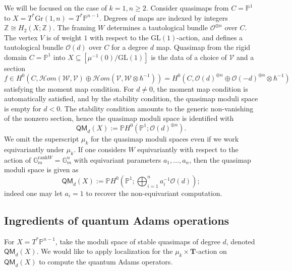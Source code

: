 \documentclass[reqno]{amsart}
\numberwithin{equation}{section}
\numberwithin{equation}{section}
\numberwithin{equation}{section}
\theoremstyle{definition}
\theoremstyle{remark}
\theoremstyle{remark}
\begin{document}
We will be focused on the case of $k=1, n \ge2$. Consider quasimaps from $C = \mathbb{P}^1$ to $X = T^*\mathrm{Gr}(1,n) = T^*\mathbb{P}^{n-1}$. Degrees of maps are indexed by integers $\mathbb{Z} \cong H_2(X;\mathbb{Z})$. The framing $W$ determines a tautological bundle $\mathcal{O}^{\oplus n}$ over $C$. The vertex $V$ is of weight $1$ with respect to the $\mathrm{GL}(1)$-action, and defines a tautological bundle $\mathcal{O}(d)$ over $C$ for a degree $d$ map. Quasimap from the rigid domain $C = \mathbb{P}^1$ into $ X \subseteq [ \mu^{-1}(0) / \mathrm{GL}(1) ]$ is the data of a choice of $\mathcal{V}$ and a section
\begin{equation}
    f \in H^0 \left( C, \mathcal{H}om(\mathcal{W}, \mathcal{V}) \oplus \mathcal{H}om(\mathcal{V}, \mathcal{W} \otimes \hbar^{-1})  \right) = H^0\left(C, \mathcal{O}(d)^{\oplus n} \oplus \mathcal{O}(-d)^{\oplus n} \otimes \hbar^{-1} \right)
\end{equation}
satisfying the moment map condition. For $d \neq 0$, the moment map condition is automatically satisfied, and by the stability condition, the quasimap moduli space is empty for $d < 0$. The stability condition amounts to the generic non-vanishing of the nonzero section, hence the quasimap moduli space is identified with
\begin{equation}
    \mathsf{QM}_d(X) := \mathbb{P} H^0 \left( \mathbb{P}^1; \mathcal{O}(d)^{\oplus n} \right).
\end{equation}
We omit the superscript $\mu_k$ for the quasimap moduli spaces even if we work equivariantly under $\mu_k$. If one considers $W$ equivariantly with respect to the action of $\mathbb{G}_m^{\mathrm{rank} W} = \mathbb{G}_m^n$ with equivariant parameters $a_1, \dots, a_n$, then the quasimap moduli space is given as
\begin{equation}
    \mathsf{QM}_d(X) := \mathbb{P} H^0 \left( \mathbb{P}^1; \bigoplus_{i=1}^n a_i^{-1} \mathcal{O}(d) \right);
\end{equation}
indeed one may let $a_i =1$ to recover the non-equivariant computation.

\subsection{Ingredients of quantum Adams operations}
For $X = T^*{\mathbb{P}^{n-1}}$, take the moduli space of stable quasimaps of degree $d$, denoted $\mathsf{QM}_d(X)$. We would like to apply localization for the $\mu_k \times \mathbf{T}$-action on $\mathsf{QM}_d(X)$ to compute the quantum Adams operators. 
\end{document}

